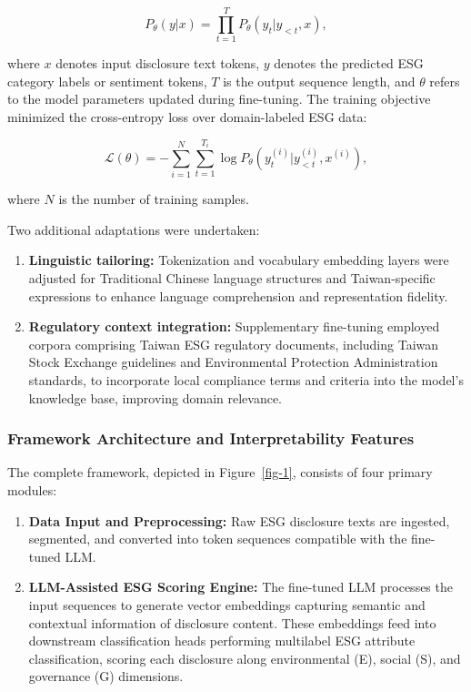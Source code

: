 \documentclass[
  12pt,
]{article}
\begin{document}
\[
P_\theta(y|x) = \prod_{t=1}^T P_\theta(y_t|y_{<t}, x),
\]

where \(x\) denotes input disclosure text tokens, \(y\) denotes the
predicted ESG category labels or sentiment tokens, \(T\) is the output
sequence length, and \(\theta\) refers to the model parameters updated
during fine-tuning. The training objective minimized the cross-entropy
loss over domain-labeled ESG data:

\[
\mathcal{L}(\theta) = - \sum_{i=1}^N \sum_{t=1}^{T_i} \log P_\theta(y_t^{(i)} | y_{<t}^{(i)}, x^{(i)}),
\]

where \(N\) is the number of training samples.

Two additional adaptations were undertaken:

\begin{enumerate}
\def\labelenumi{\arabic{enumi}.}
\item
  \textbf{Linguistic tailoring:} Tokenization and vocabulary embedding
  layers were adjusted for Traditional Chinese language structures and
  Taiwan-specific expressions to enhance language comprehension and
  representation fidelity.
\item
  \textbf{Regulatory context integration:} Supplementary fine-tuning
  employed corpora comprising Taiwan ESG regulatory documents, including
  Taiwan Stock Exchange guidelines and Environmental Protection
  Administration standards, to incorporate local compliance terms and
  criteria into the model's knowledge base, improving domain relevance.
\end{enumerate}

\subsubsection{Framework Architecture and Interpretability
Features}\label{framework-architecture-and-interpretability-features}

The complete framework, depicted in Figure~\ref{fig-1}, consists of four
primary modules:

\begin{enumerate}
\def\labelenumi{\arabic{enumi}.}
\item
  \textbf{Data Input and Preprocessing:} Raw ESG disclosure texts are
  ingested, segmented, and converted into token sequences compatible
  with the fine-tuned LLM.
\item
  \textbf{LLM-Assisted ESG Scoring Engine:} The fine-tuned LLM processes
  the input sequences to generate vector embeddings capturing semantic
  and contextual information of disclosure content. These embeddings
  feed into downstream classification heads performing multilabel ESG
  attribute classification, scoring each disclosure along environmental
  (E), social (S), and governance (G) dimensions.
\end{enumerate}
\end{document}
